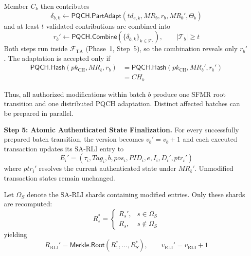 \documentclass[lettersize,journal]{IEEEtran}
\begin{document}
Member $C_k$ then contributes
\begin{equation}
\delta_{b,k}
\leftarrow
\mathsf{PQCH.PartAdapt}
(td_{e,k},MR_b,r_b,MR_b',\Theta_b)
\end{equation}
and at least $t$ validated contributions are combined into
\begin{equation}
r_b'
\leftarrow
\mathsf{PQCH.Combine}
(\{\delta_{b,k}\}_{k\in\mathcal{T}_b}),
\qquad
|\mathcal{T}_b|\geq t
\end{equation}
Both steps run inside $\mathcal{F}_{\mathrm{TA}}$ (Phase~1, Step~5), so
the combination reveals only $r_b'$. The adaptation is accepted only if
\begin{equation}
\begin{aligned}
\mathsf{PQCH.Hash}(pk_{\mathrm{CH}},MR_b,r_b)
&=
\mathsf{PQCH.Hash}(pk_{\mathrm{CH}},MR_b',r_b')\\
&=CH_b
\end{aligned}
\label{eq:pqch_cont}
\end{equation}

Thus, all authorized modifications within batch $b$ produce one SFMR
root transition and one distributed PQCH adaptation. Distinct affected
batches can be prepared in parallel.

\medskip
\noindent\textbf{Step 5: Atomic Authenticated State Finalization.}
For every successfully prepared batch transition, the version becomes
$v_b'=v_b+1$ and each executed transaction updates its SA-RLI entry to
\begin{equation}
E_i'=(\tau_i,Tag_i,b,pos_i,PID_i,e,I_i,D_i',ptr_i')
\end{equation}
where $ptr_i'$ resolves the current authenticated state under $MR_b'$.
Unmodified transaction states remain unchanged.

Let $\Omega_S$ denote the SA-RLI shards containing modified entries.
Only these shards are recomputed:
\begin{equation}
R_s^{*}=
\begin{cases}
R_s', & s\in\Omega_S\\
R_s,  & s\notin\Omega_S
\end{cases}
\end{equation}
yielding
\begin{equation}
R_{\mathrm{RLI}}'
=
\mathsf{Merkle.Root}(R_1^{*},\ldots,R_S^{*}),
\qquad
v_{\mathrm{RLI}}'=v_{\mathrm{RLI}}+1
\end{equation}
\end{document}
